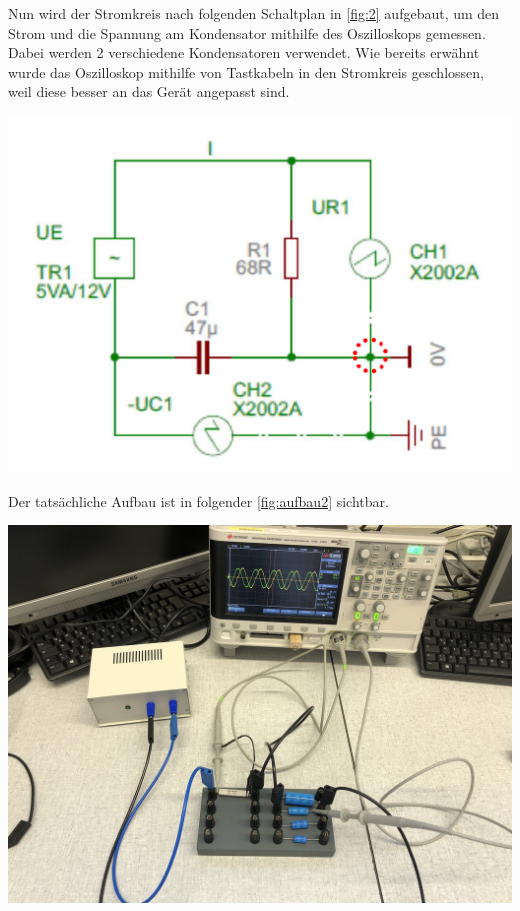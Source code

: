\documentclass[11pt,ngerman]{scrartcl}
\begin{document}
Nun wird der Stromkreis nach folgenden Schaltplan in \autoref{fig:2} aufgebaut, um den Strom und die Spannung am Kondensator mithilfe des Oszilloskops gemessen. Dabei werden 2 verschiedene Kondensatoren verwendet. Wie bereits erwähnt wurde das Oszilloskop mithilfe von Tastkabeln in den Stromkreis geschlossen, weil diese besser an das Gerät angepasst sind.

\begin{center}
	\begin{minipage}[t]{0.5\textwidth}
		\includegraphics[width=\textwidth]{skizze_2}
		\label{fig:2}
	\end{minipage}
\end{center}

\noindent Der tatsächliche Aufbau ist in folgender \autoref{fig:aufbau2} sichtbar.

\begin{center}
	\begin{minipage}[t]{0.7\textwidth}
		\includegraphics[width=\textwidth]{aufbau2}
		\label{fig:aufbau2}
	\end{minipage}
\end{center}
\end{document}
